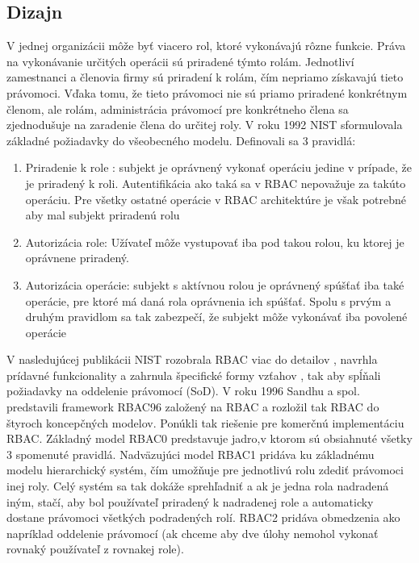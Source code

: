 \subsection{Dizajn}
V jednej organizácii môže byť viacero rol, ktoré vykonávajú rôzne funkcie. Práva na vykonávanie určitých operácii sú priradené týmto rolám. Jednotliví zamestnanci a členovia firmy sú priradení k rolám, čím nepriamo získavajú tieto právomoci.	Vďaka tomu, že tieto právomoci nie sú priamo priradené konkrétnym členom, ale rolám, administrácia právomocí pre konkrétneho člena sa zjednodušuje na zaradenie člena do určitej roly.
V roku 1992 NIST sformulovala základné požiadavky do všeobecného modelu.
Definovali sa 3  pravidlá:
\begin{enumerate}
		\item Priradenie k role : subjekt je oprávnený vykonať operáciu jedine v prípade, že je priradený k roli. Autentifikácia ako taká sa v RBAC nepovažuje za takúto operáciu. Pre všetky ostatné operácie v RBAC architektúre je však potrebné aby mal subjekt priradenú rolu
		\item Autorizácia role: Užívateľ môže vystupovať iba pod takou rolou, ku ktorej je oprávnene priradený.
		\item Autorizácia operácie: subjekt s aktívnou rolou je oprávnený spúšťať iba také operácie, pre ktoré má daná rola oprávnenia ich spúšťať. Spolu s prvým a druhým pravidlom sa tak zabezpečí, že subjekt môže vykonávať iba povolené operácie
\end{enumerate}

V nasledujúcej publikácii \cite{NIST95} NIST rozobrala RBAC viac do detailov , navrhla prídavné funkcionality a zahrnula špecifické formy vzťahov , tak aby spĺňali požiadavky na oddelenie právomocí (SoD). V roku 1996 Sandhu a spol. \cite{sandhu96} predstavili framework RBAC96 založený na RBAC a rozložil tak RBAC do štyroch koncepčných modelov. Ponúkli tak riešenie pre komerčnú implementáciu RBAC.
Základný model RBAC0 predstavuje jadro,v ktorom sú obsiahnuté všetky 3 spomenuté pravidlá. Nadväzujúci model RBAC1 pridáva ku základnému modelu hierarchický systém, čím umožňuje pre jednotlivú rolu zdediť právomoci inej roly. Celý systém sa tak dokáže sprehľadniť a ak je jedna rola nadradená iným, stačí, aby bol používateľ priradený k nadradenej role a automaticky dostane právomoci všetkých podradených rolí. RBAC2 pridáva obmedzenia ako napríklad oddelenie právomocí (ak chceme aby dve úlohy nemohol vykonať rovnaký používateľ z rovnakej role). 

